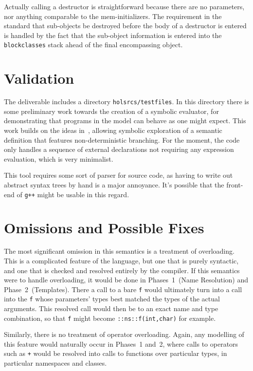 \documentclass[11pt]{article}
\begin{document}
Actually calling a destructor is straightforward because there are no
parameters, nor anything comparable to the mem-initializers.  The
requirement in the standard that sub-objects be destroyed before the
body of a destructor is entered is handled by the fact that the
sub-object information is entered into the \texttt{blockclasses} stack
ahead of the final encompassing object.

\section{Validation}
\label{sec:validation}

The deliverable includes a directory \texttt{holsrcs/testfiles}.  In
this directory there is some preliminary work towards the creation of
a symbolic evaluator, for demonstrating that programs in the model can
behave as one might expect.  This work builds on the ideas
in~\cite{netsem:popl2006}, allowing symbolic exploration of a semantic
definition that features non-deterministic branching.  For the moment,
the code only handles a sequence of external declarations not
requiring any expression evaluation, which is very minimalist.

This tool requires some sort of parser for \cpp{} source code, as
having to write out abstract syntax trees by hand is a major
annoyance.  It's possible that the front-end of \texttt{g++} might be
usable in this regard.


\section{Omissions and Possible Fixes}
\label{sec:omissions}

The most significant omission in this semantics is a treatment of
overloading.  This is a complicated feature of the language, but one
that is purely syntactic, and one that is checked and resolved
entirely by the compiler.  If this semantics were to handle
overloading, it would be done in Phases~1~(Name Resolution) and
Phase~2~(Templates).  There a call to a bare \texttt{f} would
ultimately turn into a call into the \texttt{f} whose parameters'
types best matched the types of the actual arguments.  This resolved
call would then be to an exact name and type combination, so that
\texttt{f} might become \texttt{::ns::f(int,char)} for example.

Similarly, there is no treatment of operator overloading.  Again, any
modelling of this feature would naturally occur in Phases~1 and~2,
where calls to operators such as \texttt{+} would be resolved into
calls to functions over particular types, in particular namespaces and
classes.
\end{document}
